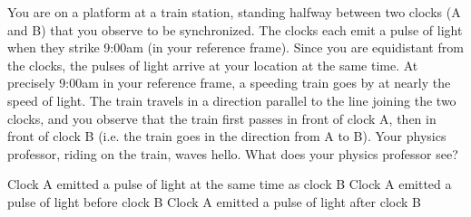 \question You are on a platform at a train station, standing halfway between two clocks (A and B) that you observe to be synchronized. The clocks each emit a pulse of light when they strike 9:00am (in your reference frame). Since you are equidistant from the clocks, the pulses of light arrive at your location at the same time. At precisely 9:00am in your reference frame, a speeding train goes by at nearly the speed of light. The train travels in a direction parallel to the line joining the two clocks, and you observe that the train first passes in front of clock A, then in front of clock B (i.e. the train goes in the direction from A to B). Your physics professor, riding on the train, waves hello. What does your physics professor see? 
\begin{checkboxes}
\choice Clock A emitted a pulse of light at the same time as clock B
\choice Clock A emitted a pulse of light before clock B
\CorrectChoice Clock A emitted a pulse of light after clock B \correct
\end{checkboxes}

%
%
